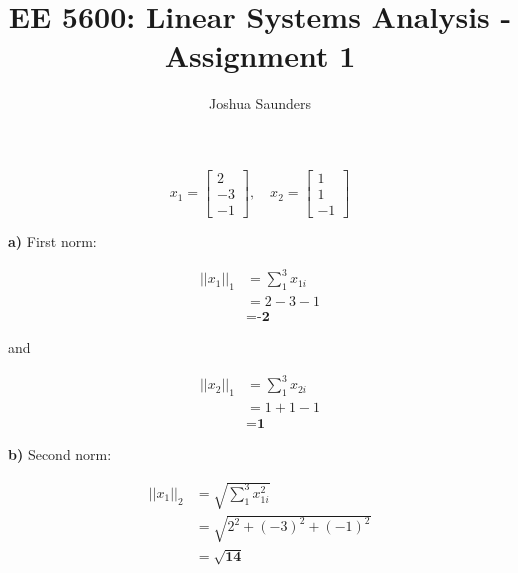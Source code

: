 \documentclass[12pt]{article}
\newenvironment{question}[2][Question]{\begin{trivlist}
\item[\hskip \labelsep {\bfseries #1}\hskip \labelsep {\bfseries #2.}]}{\end{trivlist}}
\begin{document}
 
 
\title{EE 5600: Linear Systems Analysis - Assignment 1}%
\author{Joshua Saunders\\ %
} %
 
\maketitle
 
\begin{question}{1} %
\begin{equation}
x_1 = \begin{bmatrix}2 \\ -3 \\ -1 \end{bmatrix}, \quad x_2 = \begin{bmatrix}1 \\ 1 \\ -1 \end{bmatrix} \nonumber
\end{equation}
\end{question}
 
\noindent\textbf{a)} \newline
First norm:

\begin{align*}
    ||x_1||_1 &= \sum_{1}^{3} x_{1i} \\
              &= 2 - 3 - 1 \\
              &= \textbf{-2}
\end{align*}

\noindent and

\begin{align*}
    ||x_2||_1 &= \sum_{1}^{3} x_{2i} \\
              &= 1 + 1 - 1 \\
              &= \textbf{1}
\end{align*}


\noindent\textbf{b)} \newline
Second norm:

\begin{align*}
    ||x_1||_2 &= \sqrt{\sum_{1}^{3} x_{1i}^2} \\
              &= \sqrt{2^2 + (- 3)^2 + (- 1)^2} \\
              &= \bm{\sqrt{14}}
\end{align*}
\end{document}
